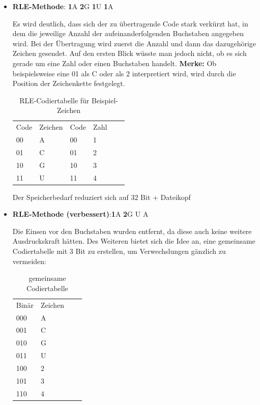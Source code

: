 \documentclass[11pt,a4paper,ngerman]{report}
\begin{document}
\begin{itemize}
			\item \textbf{RLE-Methode}:
			\textbf{1}A \textbf{2}G  \textbf{1}U \textbf{1}A
			
			\subitem Es wird deutlich, dass sich der zu übertragende Code stark verkürzt hat, in dem die jeweilige Anzahl der aufeinanderfolgenden Buchstaben angegeben wird. Bei der Übertragung wird zuerst die Anzahl und dann das dazugehörige Zeichen gesendet. Auf den ersten Blick wüsste man jedoch nicht, ob es sich gerade um eine Zahl oder einen Buchstaben handelt.  \textbf{Merke:} Ob beispielsweise eine 01 als C oder als 2 interpretiert wird, wird durch die Position der Zeichenkette festgelegt.
			
				\begin{table} [H]
				\begin{center}
					\centering
					\begin{tabular}{llllll}
						Code  & Zeichen & Code & Zahl & &  \\
						00 & A    & 00    & 1   &  &  \\
						01 & C    & 01   & 2  &  &  \\
				     	10 & G    & 10    & 3  &  & \\
						11 & U	  & 11   & 4
						
					\end{tabular}
					\label{RLE}		
					\caption{RLE-Codiertabelle für Beispiel-Zeichen}
				\end{center}
				\end{table}
			
			\subitem Der Speicherbedarf reduziert sich  auf $32$ Bit + Dateikopf
			
			\item \textbf{RLE-Methode (verbessert)}:\textbf{1}A \textbf{2}G  U A
			
			\subitem Die Einsen vor den Buchstaben wurden entfernt, da diese auch keine weitere Ausdruckskraft hätten. Des Weiteren bietet sich die Idee an, eine gemeinsame Codiertabelle mit 3 Bit zu erstellen, um Verwechslungen gänzlich zu vermeiden:
			
				\begin{table} [H]
				\begin{center}
					\centering
					\begin{tabular}{llll}
						Binär  & Zeichen &  &  \\
						000 & A       &  &  \\
						001 & C          &  &  \\
						010 & G          &  & \\
						011 & U	  & & \\
						100 & 2 & & \\
						101 & 3 & & \\
						110 & 4
						
					\end{tabular}
					\label{CT}		
					\caption{gemeinsame Codiertabelle}
				\end{center}
			\end{table}
		
				\end{itemize}
	
\end{document}
